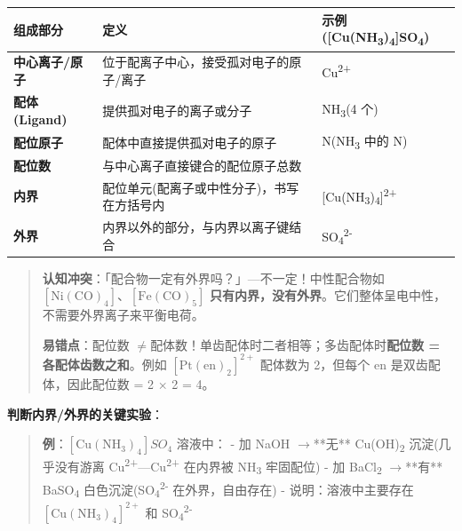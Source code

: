 \documentclass[a4paper,11pt]{ctexart}
\newcounter{none}
\newcommand{\箭}{\ensuremath{\rightarrow}}
\newcommand{\左箭}{\ensuremath{\leftarrow}}
\newcommand{\上箭}{\ensuremath{\uparrow}}
\newcommand{\下箭}{\ensuremath{\downarrow}}
\newcommand{\衡}{\ensuremath{\rightleftharpoons}}
\newcommand{\双箭}{\ensuremath{\leftrightarrow}}
\newcommand{\约等于}{\ensuremath{\approx}}
\newcommand{\小于等于}{\ensuremath{\leq}}
\newcommand{\大于等于}{\ensuremath{\geq}}
\newcommand{\不等于}{\ensuremath{\neq}}
\newcommand{\西格马}{\ensuremath{\sigma}}
\newcommand{\派}{\ensuremath{\pi}}
\begin{document}
{\def\LTcaptype{none} %
\begin{longtable}[]{@{}
  >{\raggedright\arraybackslash}p{}
  >{\raggedright\arraybackslash}p{}
  >{\raggedright\arraybackslash}p{}@{}}
\toprule\noalign{}
\begin{minipage}[b]{\linewidth}\raggedright
组成部分
\end{minipage} & \begin{minipage}[b]{\linewidth}\raggedright
定义
\end{minipage} & \begin{minipage}[b]{\linewidth}\raggedright
示例({[}Cu(NH\textsubscript{3})\textsubscript{4}{]}SO\textsubscript{4})
\end{minipage} \\
\midrule\noalign{}
\endhead
\bottomrule\noalign{}
\endlastfoot
\textbf{中心离子/原子} & 位于配离子中心，接受孤对电子的原子/离子 & Cu\textsuperscript{2+} \\
\textbf{配体 (Ligand)} & 提供孤对电子的离子或分子 & NH\textsubscript{3}(4 个) \\
\textbf{配位原子} & 配体中直接提供孤对电子的原子 & N(NH\textsubscript{3} 中的 N) \\
\textbf{配位数} & 与中心离子直接键合的配位原子总数 & 4 \\
\textbf{内界} & 配位单元(配离子或中性分子)，书写在方括号内 & {[}Cu(NH\textsubscript{3})\textsubscript{4}{]}\textsuperscript{2+} \\
\textbf{外界} & 内界以外的部分，与内界以离子键结合 & SO\textsubscript{4}\textsuperscript{2-} \\
\end{longtable}
}

\begin{quote}
\textbf{认知冲突}：「配合物一定有外界吗？」---不一定！中性配合物如 \([\mathrm{Ni(CO)_4}]\)、\([\mathrm{Fe(CO)_5}]\) \textbf{只有内界，没有外界}。它们整体呈电中性，不需要外界离子来平衡电荷。

\textbf{易错点}：配位数 \不等于 配体数！单齿配体时二者相等；多齿配体时\textbf{配位数 = 各配体齿数之和}。例如 \([\mathrm{Pt(en)_2}]^{2+}\) 配体数为 2，但每个 en 是双齿配体，因此配位数 = 2 × 2 = 4。
\end{quote}

\textbf{判断内界/外界的关键实验}：

\begin{quote}
\textbf{例}：\([\mathrm{Cu(NH_3)_4}]SO_4\) 溶液中：
- 加 NaOH \箭 **无** Cu(OH)\textsubscript{2} 沉淀(几乎没有游离 Cu\textsuperscript{2+}---Cu\textsuperscript{2+} 在内界被 NH\textsubscript{3} 牢固配位)
- 加 BaCl\textsubscript{2} \箭 **有** BaSO\textsubscript{4} 白色沉淀(SO\textsubscript{4}\textsuperscript{2-} 在外界，自由存在)
- 说明：溶液中主要存在 \([\mathrm{Cu(NH_3)_4}]^{2+}\) 和 SO\textsubscript{4}\textsuperscript{2-}
\end{quote}
\end{document}
